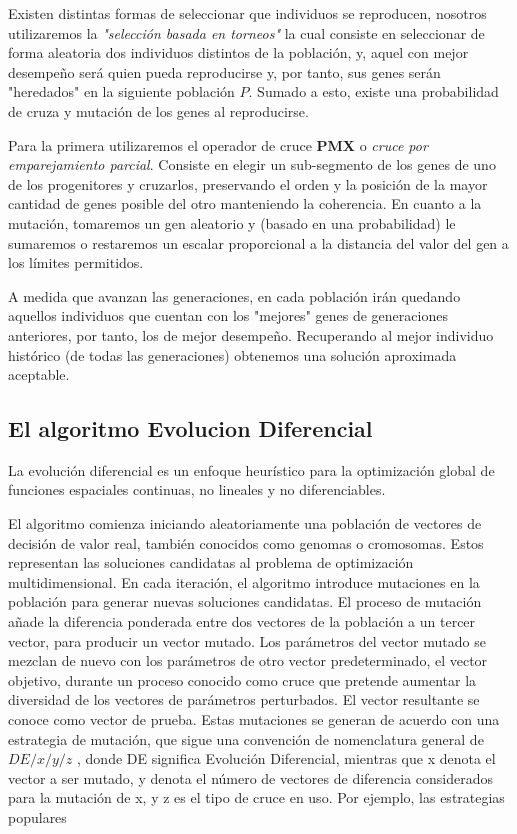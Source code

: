 \documentclass[10pt]{article}
\begin{document}
Existen distintas formas de seleccionar que individuos se reproducen, nosotros utilizaremos la \textit{"selección basada en torneos"} la cual consiste en seleccionar de forma aleatoria dos individuos distintos de la población, y, aquel con mejor desempeño será quien pueda reproducirse y, por tanto, sus genes serán "heredados" en la siguiente población $P$. Sumado a esto, existe una probabilidad de cruza y mutación de los genes al reproducirse.

Para la primera utilizaremos el operador de cruce \textbf{PMX} o \textit{cruce por emparejamiento parcial}. Consiste en elegir un sub-segmento de los genes de uno de los progenitores y cruzarlos, preservando el orden y la posición de la mayor cantidad de genes posible del otro manteniendo la coherencia.
En cuanto a la mutación, tomaremos un gen aleatorio y (basado en una probabilidad) le sumaremos o restaremos un escalar proporcional a la distancia del valor del gen a los límites permitidos.

A medida que avanzan las generaciones, en cada población irán quedando aquellos individuos que cuentan con los "mejores" genes de generaciones anteriores, por tanto, los de mejor desempeño. Recuperando al mejor individuo histórico (de todas las generaciones) obtenemos una solución aproximada aceptable.

\subsection{El algoritmo Evolucion Diferencial}

La evolución diferencial es un enfoque heurístico para la optimización global de funciones espaciales continuas, no lineales y no diferenciables. 

El algoritmo comienza iniciando aleatoriamente una población de vectores de decisión de valor real, también conocidos como genomas o cromosomas. Estos representan las soluciones candidatas al problema de optimización multidimensional.\newline
En cada iteración, el algoritmo introduce mutaciones en la población para generar nuevas soluciones candidatas. El proceso de mutación añade la diferencia ponderada entre dos vectores de la población a un tercer vector, para producir un vector mutado. Los parámetros del vector mutado se mezclan de nuevo con los parámetros de otro vector predeterminado, el vector objetivo, durante un proceso conocido como cruce que pretende aumentar la diversidad de los vectores de parámetros perturbados. El vector resultante se conoce como vector de prueba.
Estas mutaciones se generan de acuerdo con una estrategia de mutación, que sigue una convención de nomenclatura general de $DE/x/y/z$ , donde DE significa Evolución Diferencial, mientras que x denota el vector a ser mutado, y denota el número de vectores de diferencia considerados para la mutación de x, y z es el tipo de cruce en uso. Por ejemplo, las estrategias populares
\end{document}
